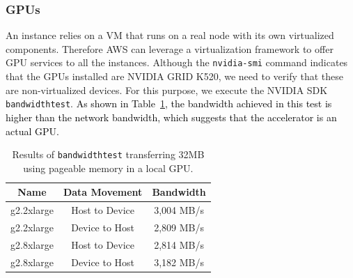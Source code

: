 \documentclass[a4paper,twoside]{article}
\begin{document}
\subsubsection{GPUs}
An instance relies on a VM that runs on a real node with its own virtualized components. 
Therefore AWS can leverage a virtualization framework to offer GPU services to all the instances.
Although the {\tt nvidia-smi} command indicates that the GPUs installed are NVIDIA GRID K520, 
we need to verify that these are non-virtualized devices. For this purpose, we execute the NVIDIA SDK {\tt bandwidthtest}. 
\textcolor{black}{As shown in Table~\ref{table:bwt}, the bandwidth achieved in this test is higher than the network bandwidth, which suggests that the accelerator is an actual GPU. }

\begin{table}[htb]
\renewcommand{\arraystretch}{1.3}
\caption{Results of {\tt bandwidthtest} transferring 32MB using pageable memory in a local GPU.}
\label{table:bwt}
\tabcolsep=0.09cm
\begin{center}\begin{tabular}{ccc}
Name &  Data Movement & Bandwidth \\ \hline \hline
g2.2xlarge & Host to Device & 3,004 MB/s \\ \hline
g2.2xlarge & Device to Host & 2,809 MB/s\\ \hline
g2.8xlarge & Host to Device & 2,814 MB/s\\ \hline
g2.8xlarge & Device to Host & 3,182 MB/s\\ \hline
\end{tabular}\end{center}\end{table}
\end{document}

